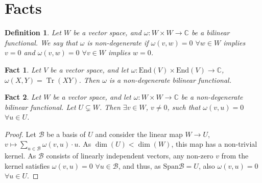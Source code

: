 \documentclass{article}
\newtheorem{fact}{Fact}
\newtheorem{definition}{Definition}
\newcommand{\tr}{\operatorname{Tr}}
\newcommand{\End}{\mathrm{End}}
\newcommand{\Span}{\mathrm{Span}}
\begin{document}
\appendix

\section{Facts}

\begin{definition}
  Let $W$ be a vector space, and $\omega: W\times W\to \mathbb{C}$ be a bilinear functional.
  We say that $\omega$ is non-degenerate if $\omega(v,w) = 0$ $\forall w\in W$ implies $v=0$ and $\omega(v,w) = 0$ $\forall v\in W$ implies $w=0$.
\end{definition}

\begin{fact}
  Let $V$ be a vector space, and let $\omega: \End(V)\times\End(V)\to \mathbb{C}$, $\omega(X,Y)= \tr(XY)$. Then $\omega$ is a non-degenerate bilinear functional.
\end{fact}


\begin{fact}
  Let $W$ be a vector space, and let $\omega: W\times W\to \mathbb{C}$ be a non-degenerate bilinear functional. Let $U\subsetneq W$. Then $\exists v\in W$, $v\neq 0$, such that  $\omega(v,u) =0$ $\forall u\in U$.
\end{fact}

\begin{proof}
   Let $\mathcal{B}$ be a basis of $U$ and consider the linear map $W\to U$, $v \mapsto \sum_{u\in \mathcal{B}} \omega(v,u) \cdot u$. As $\dim(U) < \dim(W)$, this map has a non-trivial kernel. As $\mathcal{B}$ consists of linearly independent vectors, any non-zero $v$ from the kernel satisfies $\omega(v,u) = 0$ $\forall u\in\mathcal{B}$, and thus, as $\Span \mathcal{B} = U$, also $\omega(v,u) = 0$ $\forall u \in U$.
    
\end{proof}
\end{document}
